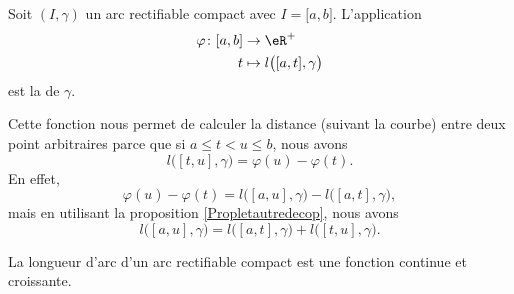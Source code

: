 \begin{definition}
    Soit $(I,\gamma)$ un arc rectifiable compact avec $I=\mathopen[ a , b \mathclose]$. L'application
    \begin{equation}
        \begin{aligned}
            \varphi\colon \mathopen[ a , b \mathclose]&\to \eR^+ \\
            t&\mapsto l\big( \mathopen[ a , t \mathclose],\gamma \big) 
        \end{aligned}
    \end{equation}
    est la  de $\gamma$.
\end{definition}
Cette fonction nous permet de calculer la distance (suivant la courbe) entre deux point arbitraires parce que si $a\leq t<u\leq b$, nous avons
\begin{equation}
    l\big( [t,u],\gamma \big)=\varphi(u)-\varphi(t).
\end{equation}
En effet,
\begin{equation}
    \varphi(u)-\varphi(t)=l\big( [a,u],\gamma \big)-l\big( [a,t],\gamma \big),
\end{equation}
mais en utilisant la proposition \ref{Propletautredecop}, nous avons
\begin{equation}
    l\big( [a,u],\gamma \big)=l\big( [a,t],\gamma \big)+l\big( [t,u],\gamma \big).
\end{equation}

\begin{proposition}
    La longueur d'arc d'un arc rectifiable compact est une fonction continue et croissante.
\end{proposition}

